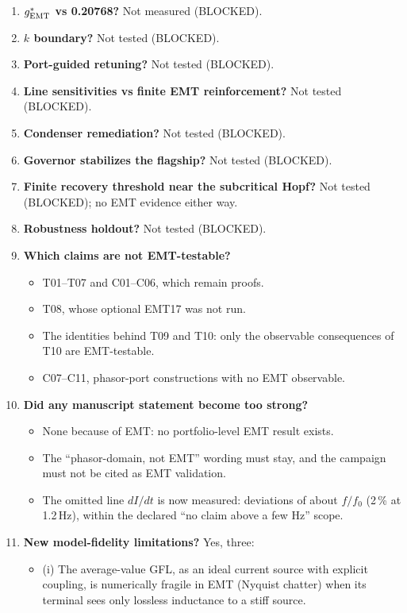 \documentclass[10pt,a4paper]{article}
\begin{document}
\begin{enumerate}[leftmargin=1.8em]
\item \textbf{$g^*_{\rm EMT}$ vs 0.20768?} Not measured (BLOCKED).
\item \textbf{$k$ boundary?} Not tested (BLOCKED).
\item \textbf{Port-guided retuning?} Not tested (BLOCKED).
\item \textbf{Line sensitivities vs finite EMT reinforcement?} Not tested
  (BLOCKED).
\item \textbf{Condenser remediation?} Not tested (BLOCKED).
\item \textbf{Governor stabilizes the flagship?} Not tested (BLOCKED).
\item \textbf{Finite recovery threshold near the subcritical Hopf?} Not tested
  (BLOCKED); no EMT evidence either way.
\item \textbf{Robustness holdout?} Not tested (BLOCKED).
\item \textbf{Which claims are not EMT-testable?}
  \begin{itemize}
  \item T01--T07 and C01--C06, which remain proofs.
  \item T08, whose optional EMT17 was not run.
  \item The identities behind T09 and T10: only the observable consequences of
    T10 are EMT-testable.
  \item C07--C11, phasor-port constructions with no EMT observable.
  \end{itemize}
\item \textbf{Did any manuscript statement become too strong?}
  \begin{itemize}
  \item None because of EMT: no portfolio-level EMT result exists.
  \item The ``phasor-domain, not EMT'' wording must stay, and the campaign must
    not be cited as EMT validation.
  \item The omitted line $dI/dt$ is now measured: deviations of about $f/f_0$
    (2\,\% at 1.2\,Hz), within the declared ``no claim above a few Hz''
    scope.
  \end{itemize}
\item \textbf{New model-fidelity limitations?} Yes, three:
  \begin{itemize}
  \item (i) The average-value GFL, as an ideal current source with explicit
    coupling, is numerically fragile in EMT (Nyquist chatter) when its
    terminal sees only lossless inductance to a stiff source.

\end{itemize}
\end{enumerate}
\end{document}

